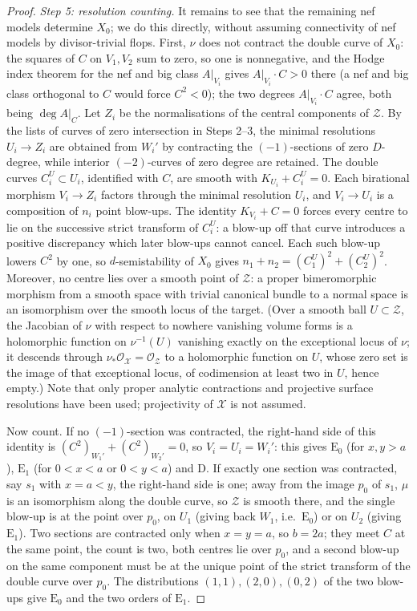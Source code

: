 \documentclass[12pt]{article}
\newcommand{\calX}{\mathcal X}
\newcommand{\calZ}{\mathcal Z}
\theoremstyle{definition}
\theoremstyle{remark}
\begin{document}
\begin{proof}
\emph{Step 5: resolution counting.}
It remains to see that the remaining nef models determine \(X_0\); we
do this directly, without assuming connectivity of nef models by
divisor-trivial flops. First, \(\nu\) does not contract the double curve
of \(X_0\): the squares of \(C\) on \(V_1,V_2\) sum to zero, so one is
nonnegative, and the Hodge index theorem for the nef and big class
\(A|_{V_i}\) gives \(A|_{V_i}\cdot C>0\) there (a nef and big class
orthogonal to \(C\) would force \(C^2<0\)); the two degrees
\(A|_{V_i}\cdot C\) agree, both being \(\deg A|_C\). Let \(Z_i\) be the normalisations of the
central components of \(\calZ\). By the lists of curves of zero
intersection in Steps 2--3, the minimal resolutions \(U_i\to Z_i\) are
obtained from \(W_i'\) by contracting the \((-1)\)-sections of zero
\(D\)-degree, while interior \((-2)\)-curves of zero degree are
retained. The double curves \(C_i^U\subset U_i\), identified with
\(C\), are smooth with \(K_{U_i}+C_i^U=0\). Each birational morphism
\(V_i\to Z_i\) factors through the minimal resolution \(U_i\), and
\(V_i\to U_i\) is a composition of \(n_i\) point blow-ups. The
identity \(K_{V_i}+C=0\) forces every centre to lie on the successive
strict transform of \(C_i^U\): a blow-up off that curve introduces a
positive discrepancy which later blow-ups cannot cancel. Each such
blow-up lowers \(C^2\) by one, so \(d\)-semistability of \(X_0\) gives
\(n_1+n_2=(C_1^U)^2+(C_2^U)^2\). Moreover, no centre lies over a smooth point of \(\calZ\): a proper
bimeromorphic morphism from a smooth space with trivial canonical
bundle to a normal space is an isomorphism over the smooth locus of
the target. (Over a smooth ball \(U\subset\calZ\), the Jacobian of
\(\nu\) with respect to nowhere vanishing volume forms is a holomorphic
function on \(\nu^{-1}(U)\) vanishing exactly on the exceptional locus
of \(\nu\); it descends through
\(\nu_*\mathcal O_{\calX}=\mathcal O_{\calZ}\) to a holomorphic function
on \(U\), whose zero set is the image of that exceptional locus, of
codimension at least two in \(U\), hence empty.) Note that only proper analytic
contractions and projective surface resolutions have been used;
projectivity of \(\calX\) is not assumed.

Now count. If no \((-1)\)-section was contracted, the right-hand side
of this identity is \((C^2)_{W_1'}+(C^2)_{W_2'}=0\), so \(V_i=U_i=W_i'\): this gives
\(\mathrm E_0\) (for \(x,y>a\)), \(\mathrm E_1\) (for \(0<x<a\) or
\(0<y<a\)) and \(\mathrm D\). If exactly one section was contracted,
say \(s_1\) with \(x=a<y\), the right-hand side is one; away from the
image \(p_0\) of \(s_1\), \(\mu\) is an isomorphism along the double
curve, so \(\calZ\) is smooth there, and the single blow-up is at the
point over \(p_0\), on \(U_1\) (giving back \(W_1\), i.e.\
\(\mathrm E_0\)) or on \(U_2\) (giving \(\mathrm E_1\)). Two sections
are contracted only when \(x=y=a\), so \(b=2a\); they meet \(C\) at
the same point, the count is two, both centres lie over \(p_0\), and a
second blow-up on the same component must be at the unique point of
the strict transform of the double curve over \(p_0\). The
distributions \((1,1),(2,0),(0,2)\) of the two blow-ups give
\(\mathrm E_0\) and the two orders of \(\mathrm E_1\).


\end{proof}
\end{document}
